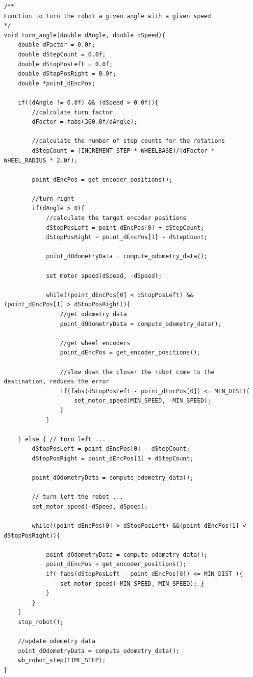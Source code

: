 \begin{lstlisting}
/**
Function to turn the robot a given angle with a given speed
*/
void turn_angle(double dAngle, double dSpeed){
	double dFactor = 0.0f;
	double dStepCount = 0.0f;
	double dStopPosLeft = 0.0f;
	double dStopPosRight = 0.0f;
	double *point_dEncPos;
	
	if((dAngle != 0.0f) && (dSpeed > 0.0f)){
		//calculate turn factor
		dFactor = fabs(360.0f/dAngle);
		
		//calculate the number of step counts for the rotations
		dStepCount = (INCREMENT_STEP * WHEELBASE)/(dFactor * WHEEL_RADIUS * 2.0f);
		
		point_dEncPos = get_encoder_positions();
		
		//turn right
		if(dAngle > 0){
			//calculate the target encoder positions
			dStopPosLeft = point_dEncPos[0] + dStepCount;
			dStopPosRight = point_dEncPos[1] - dStepCount;
			
			point_dOdometryData = compute_odometry_data();
			
			set_motor_speed(dSpeed, -dSpeed);
			
			while((point_dEncPos[0] < dStopPosLeft) && (point_dEncPos[1] > dStopPosRight)){
				//get odometry data
				point_dOdometryData = compute_odometry_data();
				
				//get wheel encoders
				point_dEncPos = get_encoder_positions();
				
				//slow down the closer the robot come to the destination, reduces the error
				if(fabs(dStopPosLeft - point_dEncPos[0]) <= MIN_DIST){
					set_motor_speed(MIN_SPEED, -MIN_SPEED);
				}
			}	
		
	} else { // turn left ...
		dStopPosLeft = point_dEncPos[0] - dStepCount;
		dStopPosRight = point_dEncPos[1] + dStepCount;
		
		point_dOdometryData = compute_odometry_data();

		// turn left the robot ...
		set_motor_speed(-dSpeed, dSpeed);

		while((point_dEncPos[0] > dStopPosLeft) &&(point_dEncPos[1] < dStopPosRight)){

			point_dOdometryData = compute_odometry_data();
			point_dEncPos = get_encoder_positions();
			if( fabs(dStopPosLeft - point_dEncPos[0]) <= MIN_DIST ){
				set_motor_speed(-MIN_SPEED, MIN_SPEED); }
			}
		}
	}
	stop_robot();
	
	//update odometry data
	point_dOdometryData = compute_odometry_data();
	wb_robot_step(TIME_STEP);
}
\end{lstlisting}

